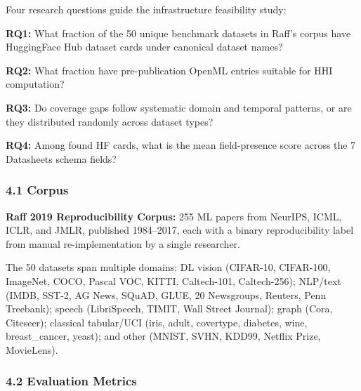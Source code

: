 
Four research questions guide the infrastructure feasibility study:

\textbf{RQ1:} What fraction of the 50 unique benchmark datasets in Raff's corpus have HuggingFace Hub dataset cards under canonical dataset names?

\textbf{RQ2:} What fraction have pre-publication OpenML entries suitable for HHI computation?

\textbf{RQ3:} Do coverage gaps follow systematic domain and temporal patterns, or are they distributed randomly across dataset types?

\textbf{RQ4:} Among found HF cards, what is the mean field-presence score across the 7 Datasheets schema fields?

\subsubsection{4.1 Corpus}

\textbf{Raff 2019 Reproducibility Corpus:} 255 ML papers from NeurIPS, ICML, ICLR, and JMLR, published 1984--2017, each with a binary reproducibility label from manual re-implementation by a single researcher.

\begin{table}[htbp]
\centering
{}
\end{table}

The 50 datasets span multiple domains: DL vision (CIFAR-10, CIFAR-100, ImageNet, COCO, Pascal VOC, KITTI, Caltech-101, Caltech-256); NLP/text (IMDB, SST-2, AG News, SQuAD, GLUE, 20 Newsgroups, Reuters, Penn Treebank); speech (LibriSpeech, TIMIT, Wall Street Journal); graph (Cora, Citeseer); classical tabular/UCI (iris, adult, covertype, diabetes, wine, breast\_cancer, yeast); and other (MNIST, SVHN, KDD99, Netflix Prize, MovieLens).

\subsubsection{4.2 Evaluation Metrics}

